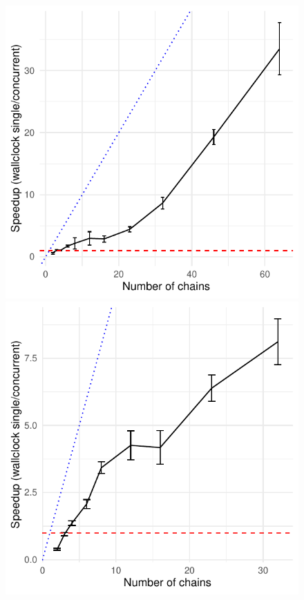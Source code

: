 \begin{figure}[t]
    \centering
    \begin{minipage}{0.4\textwidth}
      \centering
      \includegraphics[width=\textwidth]{../img/speedup_distributed.pdf}
    \end{minipage}
    \begin{minipage}{0.4\textwidth}
      \centering
      \includegraphics[width=\textwidth]{../img/speedup_parallel.pdf}

\end{minipage}
\end{figure}
